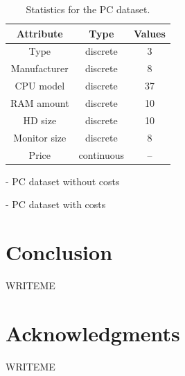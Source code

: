 \documentclass{article}
\renewcommand\[{\begin{equation}}
\renewcommand\]{\end{equation}}
\begin{document}
\begin{table}
    \centering
    \begin{tabular}{ccc}
        {\bf Attribute} & {\bf Type} & {\bf Values} \\
        \hline \hline
        Type & discrete & 3 \\
        Manufacturer & discrete & 8 \\
        CPU model & discrete & 37 \\
        RAM amount & discrete & 10 \\
        HD size & discrete & 10 \\
        Monitor size & discrete & 8 \\
        Price & continuous & --
    \end{tabular}
    \caption{\label{tab:pcdataset} Statistics for the PC dataset.}
\end{table}

- PC dataset without costs

- PC dataset with costs

\section{Conclusion}

WRITEME

\section*{Acknowledgments}

WRITEME




\onecolumn
\end{document}
